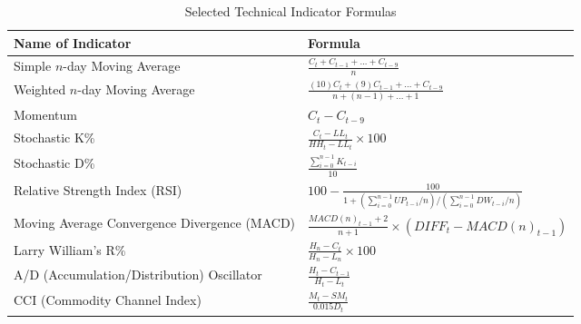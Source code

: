 \begin{table*}[h]
\centering
\caption{Selected Technical Indicator Formulas \cite{Kara2011}}
\label{tab:table4}
\begingroup
\setlength{\tabcolsep}{10pt}
\renewcommand{\arraystretch}{2}%
\begin{tabular}{ll} %
\hline
\textbf{Name of Indicator}
& \textbf{Formula}                                              \\ \hline
Simple $n$-day Moving Average
& $\frac{C_t + C_{t-1} + ... + C_{t-9}}{n}$                     \\ 
Weighted $n$-day Moving Average
& $\frac{(10)C_t + (9)C_{t-1} + ... + C_{t-9}}{n + (n-1) + ... + 1}$
\\ 
Momentum
& $C_t - C_{t-9}$                                               \\ 
Stochastic K\%
& $\frac{C_t - LL_t}{HH_t - LL_t} \times 100$                   \\ 
Stochastic D\%
& $\frac{\sum_{i=0}^{n-1} K_{t-i}}{10}$                         \\ 
Relative Strength Index (RSI)
& $100 - \frac{100}{1 + \left(\sum_{i=0}^{n-1} UP_{t-i}/n\right)/\left(\sum_{i=0}^{n-1} DW_{t-i}/n\right)}$

\\ 
Moving Average Convergence Divergence (MACD) 
& $\frac{MACD(n)_{t-1} + 2}{n+1} \times (DIFF_t - MACD(n)_{t-1})$
\\ 
Larry William’s R\%
& $\frac{H_n - C_t}{H_n - L_n} \times 100$                      \\ 
A/D (Accumulation/Distribution) Oscillator
& $\frac{H_t - C_{t-1}}{H_t - L_t}$                             \\ 
CCI (Commodity Channel Index)
& $\frac{M_t - SM_t}{0.015D_t}$                                 \\ \hline
\end{tabular}
\endgroup
\end{table*}